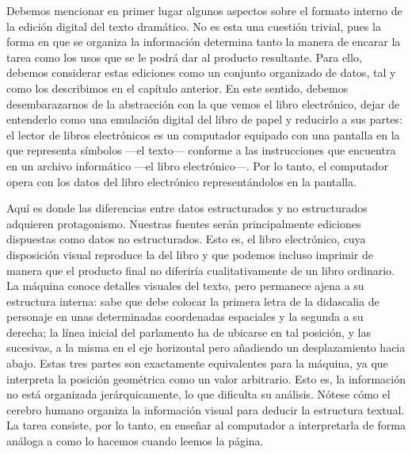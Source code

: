 Debemos mencionar en primer lugar algunos aspectos sobre el formato interno de la edición digital del texto dramático. No es esta una cuestión trivial, pues la forma en que se organiza la información determina tanto la manera de encarar la tarea como los usos que se le podrá dar al producto resultante. Para ello, debemos considerar estas ediciones como un conjunto organizado de datos, tal y como los describimos en el capítulo anterior. En este sentido, debemos desembarazarnos de la abstracción con la que vemos el libro electrónico, dejar de entenderlo como una emulación digital del libro de papel y reducirlo a sus partes: el lector de libros electrónicos es un computador equipado con una pantalla en la que representa símbolos —\nolinebreak el texto\nolinebreak— conforme a las instrucciones que encuentra en un archivo informático —\nolinebreak el libro electrónico\nolinebreak—\nolinebreak. Por lo tanto, el computador opera con los datos del libro electrónico representándolos en la pantalla.

Aquí es donde las diferencias entre datos estructurados y no estructurados adquieren protagonismo. Nuestras fuentes serán principalmente ediciones dispuestas como datos no estructurados. Esto es, el libro electrónico, cuya disposición visual reproduce la del libro y que podemos incluso imprimir de manera que el producto final no diferiría cualitativamente de un libro ordinario. La máquina conoce detalles visuales del texto, pero permanece ajena a su estructura interna: sabe que debe colocar la primera letra de la didascalia de personaje en unas determinadas coordenadas espaciales y la segunda a su derecha; la línea inicial del parlamento ha de ubicarse en tal posición, y las sucesivas, a la misma en el eje horizontal pero añadiendo un desplazamiento hacia abajo. Estas tres partes son exactamente equivalentes para la máquina, ya que interpreta la posición geométrica como un valor arbitrario. Esto es, la información no está organizada jerárquicamente, lo que dificulta su análisis. Nótese cómo el cerebro humano organiza la información visual para deducir la estructura textual. La tarea consiste, por lo tanto, en enseñar al computador a interpretarla de forma análoga a como lo hacemos cuando leemos la página.

